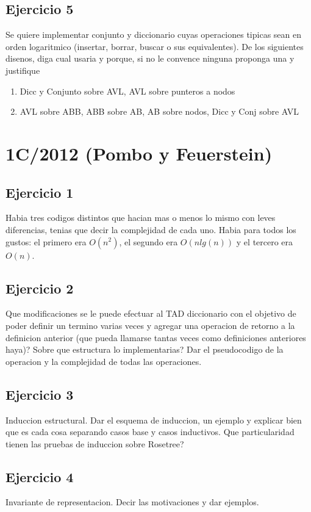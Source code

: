 \documentclass[10pt, a4paper]{report}
\begin{document}
\subsection*{Ejercicio 5}

Se quiere implementar conjunto y diccionario cuyas operaciones tipicas sean en orden logaritmico (insertar, borrar, buscar o sus equivalentes). De los siguientes disenos, diga cual usaria y porque, si no le convence ninguna proponga una y justifique
\begin{enumerate}
 \item Dicc y Conjunto sobre AVL, AVL sobre punteros a nodos
 \item AVL sobre ABB, ABB sobre AB, AB sobre nodos, Dicc y Conj sobre AVL
\end{enumerate}

\newpage
\section{1C/2012 (Pombo y Feuerstein)}

\subsection*{Ejercicio 1}
Habia tres codigos distintos que hacian mas o menos lo mismo con leves diferencias, tenias que decir la complejidad de cada uno. Habia para todos los gustos: el primero era $O(n^2)$, el segundo era $O(nlg(n))$ y el tercero era $O(n)$.

\subsection*{Ejercicio 2}
Que modificaciones se le puede efectuar al TAD diccionario con el objetivo de poder definir un termino varias veces y agregar una operacion de retorno a la definicion anterior (que pueda llamarse tantas veces como definiciones anteriores haya)? Sobre que estructura lo implementarias? Dar el pseudocodigo de la operacion y la complejidad de todas las operaciones.

\subsection*{Ejercicio 3}
Induccion estructural. Dar el esquema de induccion, un ejemplo y explicar bien que es cada cosa separando casos base y casos inductivos. Que particularidad tienen las pruebas de induccion sobre Rosetree?

\subsection*{Ejercicio 4}
Invariante de representacion. Decir las motivaciones y dar ejemplos.
\end{document}
